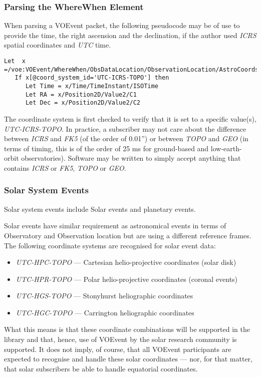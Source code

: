 \documentclass[11pt,a4paper]{ivoa}
\begin{document}
\subsubsection{Parsing the WhereWhen Element}
\label{sec:3.4.3}
When parsing a VOEvent packet, the following pseudocode may be of use to provide
the time, the right ascension and the declination, if the author used
\emph{ICRS} spatial coordinates and \emph{UTC} time.
\begin{lstlisting}
Let  x =/voe:VOEvent/WhereWhen/ObsDataLocation/ObservationLocation/AstroCoords
   If x[@coord_system_id='UTC-ICRS-TOPO'] then
      Let Time = x/Time/TimeInstant/ISOTime
      Let RA = x/Position2D/Value2/C1
      Let Dec = x/Position2D/Value2/C2
\end{lstlisting}

The coordinate system is first checked to verify that it is set to a specific
value(s), \emph{UTC-ICRS-TOPO}. In practice, a subscriber may not care about the
difference between \emph{ICRS} and \emph{FK5} (of the order of 0.01'') or
between \emph{TOPO} and \emph{GEO} (in terms of timing, this is of the order of
25 ms for ground-based and low-earth-orbit observatories). Software may be
written to simply accept anything that contains \emph{ICRS} or \emph{FK5},
\emph{TOPO} or \emph{GEO}.


\subsubsection{Solar System Events}
\label{sec:3.4.4}
Solar system events include Solar events and planetary events.

Solar events have similar requirement as astronomical events in terms of
Observatory and Observation location but are using a different reference frames.
The following coordinate systems are recognised for solar event data:
\begin{itemize}
\item \emph{UTC-HPC-TOPO} --- Cartesian helio-projective coordinates (solar
disk)
\item \emph{UTC-HPR-TOPO} --- Polar helio-projective coordinates (coronal
events)
\item \emph{UTC-HGS-TOPO} --- Stonyhurst heliographic coordinates
\item \emph{UTC-HGC-TOPO} --- Carrington heliographic coordinates
\end{itemize}

What this means is that these coordinate combinations will be supported in the
library and that, hence, use of VOEvent by the solar research community is
supported. It does not imply, of course, that all VOEvent participants are
expected to recognise and handle these solar coordinates --- nor, for that
matter, that solar subscribers be able to handle equatorial coordinates.
\end{document}
